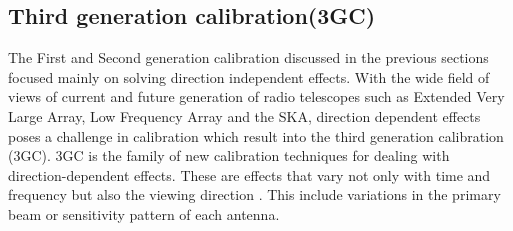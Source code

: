 \subsection{Third generation calibration(3GC)}

The First and Second generation calibration discussed in the previous sections focused mainly on solving direction independent effects. With the wide field of views of current and future generation of radio telescopes such as Extended Very Large Array, Low Frequency Array and the SKA, direction dependent effects poses a challenge in calibration which result into the third generation calibration (3GC). 3GC is the family of new calibration techniques for dealing with direction-dependent effects. These are effects that vary not only with time and frequency but also the viewing direction \citep{pandey2009calibrating}. This include variations in the primary beam or sensitivity pattern of each antenna. 
